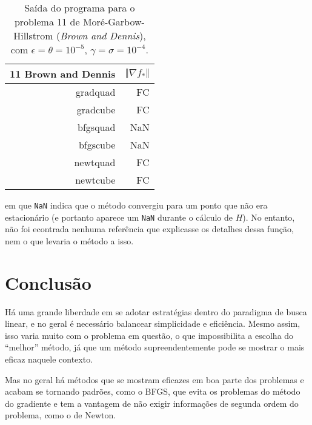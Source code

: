 \documentclass[a4paper,11pt]{article}
\begin{document}
            \begin{table}[h!]
                \centering
                \begin{tabular}{r|r}
                    11 Brown and Dennis & $\Vert\nabla f_*\Vert$ \\
                    \hline
                    gradquad&        FC \\
                    gradcube&        FC \\
                    bfgsquad&       NaN \\
                    bfgscube&       NaN \\
                    newtquad&        FC \\
                    newtcube&        FC \\
                \end{tabular}
                \caption{Saída do programa para o problema 11 de Moré-Garbow-Hillstrom (\emph{Brown and Dennis}), com $\epsilon = \theta = 10^{-5} $, $\gamma = \sigma = 10^{-4}$.}
            \end{table}
            em que \texttt{NaN} indica que o método convergiu para um ponto que não era estacionário (e portanto aparece um \texttt{NaN} durante o cálculo de $H$). No entanto, não foi econtrada nenhuma referência que explicasse os detalhes dessa função, nem o que levaria o método a isso.

    \section*{Conclusão}
        Há uma grande liberdade em se adotar estratégias dentro do paradigma de busca linear, e no geral é necessário balancear simplicidade e eficiência. Mesmo assim, isso varia muito com o problema em questão, o que impossibilita a escolha do ``melhor'' método, já que um método supreendentemente pode se mostrar o mais eficaz naquele contexto.

        Mas no geral há métodos que se mostram eficazes em boa parte dos problemas e acabam se tornando padrões, como o BFGS, que evita os problemas do método do gradiente e tem a vantagem de não exigir informações de segunda ordem do problema, como o de Newton.
    
\end{document}
